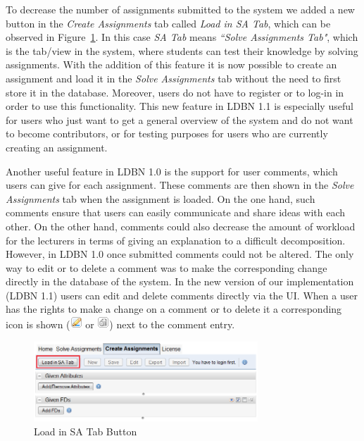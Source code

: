 To decrease the number of assignments submitted to the system we added a new button
in the \emph{Create Assignments} tab called \emph{Load in SA Tab}, 
which can be observed in Figure~\ref{fig:load-in-sa}. 
In this case \emph{SA Tab} means \emph{``Solve Assignments Tab"},
which is the tab/view in the system, where students can test their knowledge by solving assignments. 
With the addition of this feature it is now possible to create an assignment and load it 
in the \emph{Solve Assignments} tab without
the need to first store it in the database. Moreover, users do not have to register or 
to log-in in order to use this
functionality. This new feature in LDBN 1.1 is especially useful for users who 
just want to get a general overview of the system and
do not want to become contributors, 
or for testing purposes for users who are currently creating an assignment. 

Another useful feature in LDBN 1.0 is the support for user comments, 
which users can give for each assignment. These comments
are then shown in the \emph{Solve Assignments} tab when the assignment is loaded. On the one
hand, such comments ensure that users can easily communicate and share ideas with each
other. On the other hand, comments could also decrease the amount of workload
for the lecturers in terms of giving an explanation to a difficult decomposition. However, in LDBN 1.0  
once submitted comments could not be altered. The only way to edit or to delete a
comment was to make the corresponding change directly in the database of the system. 
In the new version of our implementation (LDBN 1.1) 
users can edit and delete comments directly via the UI. When a user has
the rights to make a change on a comment or to delete it a corresponding icon is shown 
(\includegraphics[scale=0.7]{./img/edit.png} or \includegraphics[scale=0.7]{./img/del.png})
next to the comment entry.

\begin{figure}[ht]
	\begin{center}
		\includegraphics[width=0.75\textwidth]{./img/load-in-sa.png}
		\caption{Load in SA Tab Button}
		\label{fig:load-in-sa}
	\end{center}
\end{figure}
